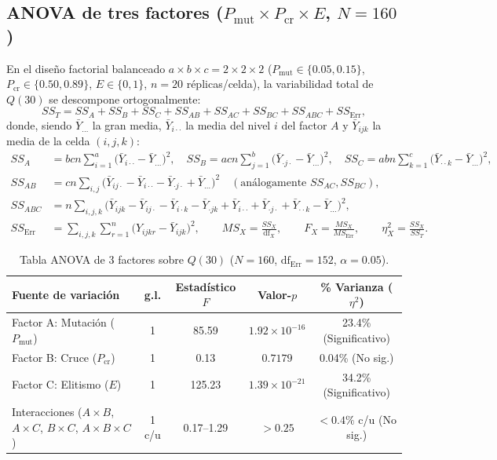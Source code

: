 \documentclass[11pt,a4paper]{article}
\begin{document}
\subsection{ANOVA de tres factores ($P_{\text{mut}} \times P_{\text{cr}} \times E$, $N = 160$)}
En el dise\~no factorial balanceado $a \times b \times c = 2 \times 2 \times 2$ ($P_{\text{mut}} \in \{0.05, 0.15\}$, $P_{\text{cr}} \in \{0.50, 0.89\}$, $E \in \{0, 1\}$, $n = 20$ r\'eplicas/celda), la variabilidad total de $Q(30)$ se descompone ortogonalmente:
\begin{equation}
SS_T = SS_A + SS_B + SS_C + SS_{AB} + SS_{AC} + SS_{BC} + SS_{ABC} + SS_{\text{Err}},
\end{equation}
donde, siendo $\bar{Y}_{\dots}$ la gran media, $\bar{Y}_{i\cdot\cdot}$ la media del nivel $i$ del factor $A$ y $\bar{Y}_{ijk}$ la media de la celda $(i,j,k)$:
\begin{align}
SS_A &= bcn\sum_{i=1}^{a}\big(\bar{Y}_{i\cdot\cdot} - \bar{Y}_{\dots}\big)^2, \quad
SS_B = acn\sum_{j=1}^{b}\big(\bar{Y}_{\cdot j\cdot} - \bar{Y}_{\dots}\big)^2, \quad
SS_C = abn\sum_{k=1}^{c}\big(\bar{Y}_{\cdot\cdot k} - \bar{Y}_{\dots}\big)^2, \\
SS_{AB} &= cn\sum_{i,j}\big(\bar{Y}_{ij\cdot} - \bar{Y}_{i\cdot\cdot} - \bar{Y}_{\cdot j\cdot} + \bar{Y}_{\dots}\big)^2
\quad (\text{an\'alogamente } SS_{AC}, SS_{BC}), \\
SS_{ABC} &= n\sum_{i,j,k}\big(\bar{Y}_{ijk} - \bar{Y}_{ij\cdot} - \bar{Y}_{i\cdot k} - \bar{Y}_{\cdot jk} + \bar{Y}_{i\cdot\cdot} + \bar{Y}_{\cdot j\cdot} + \bar{Y}_{\cdot\cdot k} - \bar{Y}_{\dots}\big)^2, \\
SS_{\text{Err}} &= \sum_{i,j,k}\sum_{r=1}^{n}\big(Y_{ijkr} - \bar{Y}_{ijk}\big)^2, \qquad
MS_X = \frac{SS_X}{\text{df}_X}, \qquad
F_X = \frac{MS_X}{MS_{\text{Err}}}, \qquad
\eta^2_X = \frac{SS_X}{SS_T}.
\end{align}

\begin{table}[h]
\centering
\caption{Tabla ANOVA de 3 factores sobre $Q(30)$ ($N = 160$, $\text{df}_{\text{Err}} = 152$, $\alpha = 0.05$).}
\begin{tabular}{@{}lcccc@{}}
\toprule
\textbf{Fuente de variaci\'on} & \textbf{g.l.} & \textbf{Estad\'istico $F$} & \textbf{Valor-$p$} & \textbf{\% Varianza ($\eta^2$)} \\
\midrule
Factor A: Mutaci\'on ($P_{\text{mut}}$) & 1 & 85.59 & $1.92\times 10^{-16}$ & 23.4\% (Significativo) \\
Factor B: Cruce ($P_{\text{cr}}$) & 1 & 0.13 & $0.7179$ & 0.04\% (No sig.) \\
Factor C: Elitismo ($E$) & 1 & 125.23 & $1.39\times 10^{-21}$ & 34.2\% (Significativo) \\
Interacciones ($A\times B$, $A\times C$, $B\times C$, $A\times B\times C$) & 1 c/u & 0.17--1.29 & $>0.25$ & $<0.4\%$ c/u (No sig.) \\
\bottomrule
\end{tabular}
\end{table}
\end{document}
